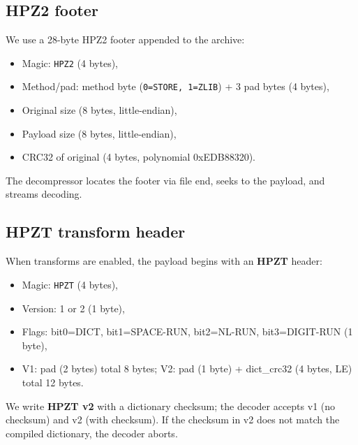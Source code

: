 \documentclass[11pt]{article}
\begin{document}
\subsection{HPZ2 footer}
We use a 28-byte HPZ2 footer appended to the archive:
\begin{itemize}[nosep]
  \item Magic: \texttt{HPZ2} (4 bytes),
  \item Method/pad: method byte (\texttt{0=STORE, 1=ZLIB}) + 3 pad bytes (4 bytes),
  \item Original size (8 bytes, little-endian),
  \item Payload size (8 bytes, little-endian),
  \item CRC32 of original (4 bytes, polynomial 0xEDB88320).
\end{itemize}
The decompressor locates the footer via file end, seeks to the payload, and streams decoding.

\subsection{HPZT transform header}
When transforms are enabled, the payload begins with an \textbf{HPZT} header:
\begin{itemize}[nosep]
  \item Magic: \texttt{HPZT} (4 bytes),
  \item Version: 1 or 2 (1 byte),
  \item Flags: bit0=DICT, bit1=SPACE-RUN, bit2=NL-RUN, bit3=DIGIT-RUN (1 byte),
  \item V1: pad (2 bytes) total 8 bytes; V2: pad (1 byte) + dict\_crc32 (4 bytes, LE) total 12 bytes.
\end{itemize}
We write \textbf{HPZT v2} with a dictionary checksum; the decoder accepts v1 (no checksum) and v2 (with checksum). If the checksum in v2 does not match the compiled dictionary, the decoder aborts.
\end{document}
